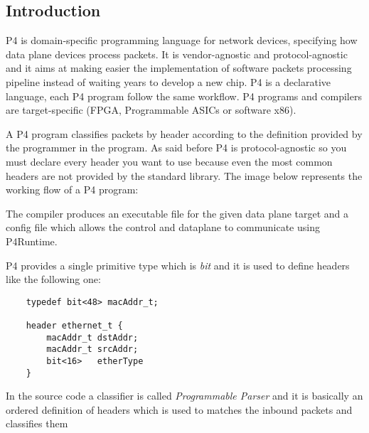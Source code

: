 \documentclass[../sn.tex]{subfiles}
\begin{document}
\subsection{Introduction}
P4 is domain-specific programming language for network devices, specifying how data plane devices process packets.
It is vendor-agnostic and protocol-agnostic and it aims at making easier the implementation of software packets processing pipeline instead of waiting years to develop a new chip.
P4 is a declarative language, each P4 program follow the same workflow.
P4 programs and compilers are target-specific (FPGA, Programmable ASICs or software x86).

A P4 program classifies packets by header according to the definition provided by the programmer in the program.
As said before P4 is protocol-agnostic so you must declare every header you want to use because even the most common headers are not provided by the standard library.
The image below represents the working flow of a P4 program:


The compiler produces an executable file for the given data plane target and a config file which allows the control and dataplane to communicate using P4Runtime.

P4 provides a single primitive type which is \emph{bit} and it is used to define headers like the following one:
\begin{lstlisting}
    typedef bit<48> macAddr_t;

    header ethernet_t {
        macAddr_t dstAddr;
        macAddr_t srcAddr;
        bit<16>   etherType
    }
\end{lstlisting}
In the source code a classifier is called \emph{Programmable Parser} and it is basically an ordered definition of headers which is used to matches the inbound packets and classifies them

\begin{lstlisting}

\end{lstlisting}
\end{document}
